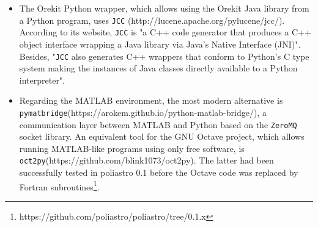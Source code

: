 \begin{itemize}
\item The Orekit Python wrapper, which allows using the Orekit Java library from a Python program, uses \verb|JCC| (http://lucene.apache.org/pylucene/jcc/). According to its website, \verb|JCC| is "a C++ code generator that produces a C++ object interface wrapping a Java library via Java's Native Interface (JNI)". Besides, "\verb|JCC| also generates C++ wrappers that conform to Python's C type system making the instances of Java classes directly available to a Python interpreter".
\item Regarding the MATLAB environment, the most modern alternative is \verb|pymatbridge|(https://arokem.github.io/python-matlab-bridge/), a communication layer between MATLAB and Python based on the \verb|ZeroMQ| socket library\cite{hintjens2013zeromq}. An equivalent tool for the GNU Octave project\cite{eaton1997gnu}, which allows running MATLAB-like programs using only free software, is \verb|oct2py|(https://github.com/blink1073/oct2py). The latter had been successfully tested in poliastro 0.1 before the Octave code was replaced by Fortran subroutines\footnote{https://github.com/poliastro/poliastro/tree/0.1.x}.
\end{itemize}